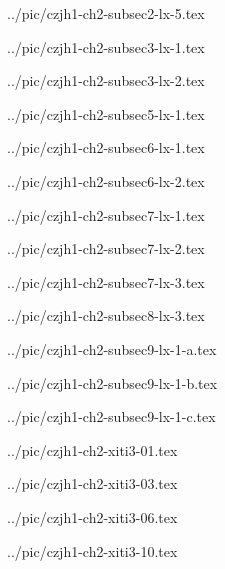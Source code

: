

../pic/czjh1-ch2-subsec2-lx-5.tex



../pic/czjh1-ch2-subsec3-lx-1.tex



../pic/czjh1-ch2-subsec3-lx-2.tex



../pic/czjh1-ch2-subsec5-lx-1.tex



../pic/czjh1-ch2-subsec6-lx-1.tex



../pic/czjh1-ch2-subsec6-lx-2.tex



../pic/czjh1-ch2-subsec7-lx-1.tex



../pic/czjh1-ch2-subsec7-lx-2.tex



../pic/czjh1-ch2-subsec7-lx-3.tex



../pic/czjh1-ch2-subsec8-lx-3.tex



../pic/czjh1-ch2-subsec9-lx-1-a.tex



../pic/czjh1-ch2-subsec9-lx-1-b.tex



../pic/czjh1-ch2-subsec9-lx-1-c.tex



../pic/czjh1-ch2-xiti3-01.tex



../pic/czjh1-ch2-xiti3-03.tex



../pic/czjh1-ch2-xiti3-06.tex



../pic/czjh1-ch2-xiti3-10.tex

